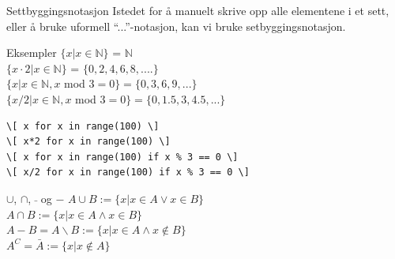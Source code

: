 \begin{frame}[fragile]{Settbyggingsnotasjon}
    Istedet for å manuelt skrive opp alle elementene i et sett, eller å bruke uformell \enquote{...}-notasjon, kan vi bruke setbyggingsnotasjon.
    \begin{block}{Eksempler}
        $\{ x | x \in \mathbb{N}\}$ = $\mathbb{N}$\\
        $\{ x \cdot 2 | x \in \mathbb{N}\}$ = $\{0, 2, 4, 6, 8, ....\}$\\
        $\{x | x \in \mathbb{N}, x$ mod $3 = 0 \} = \{0, 3, 6, 9, ...\}$\\
        $\{x/2 | x \in \mathbb{N}, x$ mod $3 = 0\} = \{0, 1.5, 3, 4.5, ...\}$
    \end{block}
    \pause
    \begin{verbatim}
\[ x for x in range(100) \]
\[ x*2 for x in range(100) \]
\[ x for x in range(100) if x % 3 == 0 \]
\[ x/2 for x in range(100) if x % 3 == 0 \]
    \end{verbatim}
\end{frame} 

\begin{frame}{$\cup$, $\cap$, $\bar{}$ og $-$}
    $A \cup B := \{x | x \in A \lor x \in B\}$ \\
    $A \cap B := \{x | x \in A \land x \in B\}$\\
    $A - B = A \backslash B := \{x | x \in A\land  x \notin B\}$\\
    $A^C = \bar{A} := \{x | x \notin A\}$
    
    \pause
    \begin{figure}%
        \centering
        \qquad
        \qquad
        \qquad
        \label{fig:example2}%
    \end{figure}
\end{frame}

